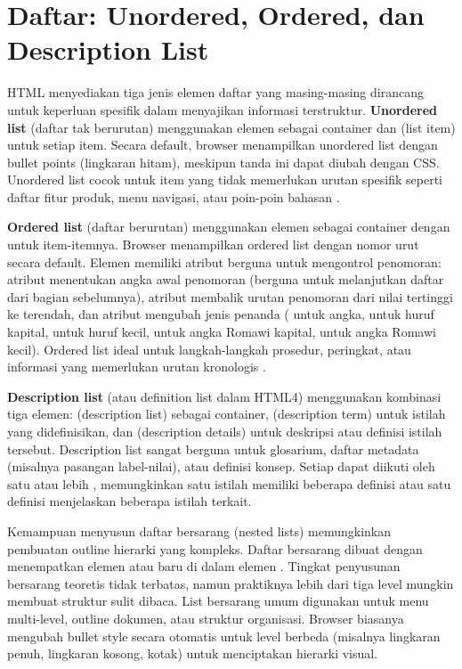 ﻿\section{Daftar: Unordered, Ordered, dan Description List}

HTML menyediakan tiga jenis elemen daftar yang masing-masing dirancang untuk keperluan spesifik dalam menyajikan informasi terstruktur. \textbf{Unordered list} (daftar tak berurutan) menggunakan elemen  sebagai container dan  (list item) untuk setiap item. Secara default, browser menampilkan unordered list dengan bullet points (lingkaran hitam), meskipun tanda ini dapat diubah dengan CSS. Unordered list cocok untuk item yang tidak memerlukan urutan spesifik seperti daftar fitur produk, menu navigasi, atau poin-poin bahasan \cite{mdnHtmlIntro}.

\textbf{Ordered list} (daftar berurutan) menggunakan elemen  sebagai container dengan  untuk item-itemnya. Browser menampilkan ordered list dengan nomor urut secara default. Elemen  memiliki atribut berguna untuk mengontrol penomoran: atribut  menentukan angka awal penomoran (berguna untuk melanjutkan daftar dari bagian sebelumnya), atribut  membalik urutan penomoran dari nilai tertinggi ke terendah, dan atribut  mengubah jenis penanda ( untuk angka,  untuk huruf kapital,  untuk huruf kecil,  untuk angka Romawi kapital,  untuk angka Romawi kecil). Ordered list ideal untuk langkah-langkah prosedur, peringkat, atau informasi yang memerlukan urutan kronologis \cite{webdevHtml}.

\textbf{Description list} (atau definition list dalam HTML4) menggunakan kombinasi tiga elemen:  (description list) sebagai container,  (description term) untuk istilah yang didefinisikan, dan  (description details) untuk deskripsi atau definisi istilah tersebut. Description list sangat berguna untuk glosarium, daftar metadata (misalnya pasangan label-nilai), atau definisi konsep. Setiap  dapat diikuti oleh satu atau lebih , memungkinkan satu istilah memiliki beberapa definisi atau satu definisi menjelaskan beberapa istilah terkait.

Kemampuan menyusun daftar bersarang (nested lists) memungkinkan pembuatan outline hierarki yang kompleks. Daftar bersarang dibuat dengan menempatkan elemen  atau  baru di dalam elemen . Tingkat penyusunan bersarang teoretis tidak terbatas, namun praktiknya lebih dari tiga level mungkin membuat struktur sulit dibaca. List bersarang umum digunakan untuk menu multi-level, outline dokumen, atau struktur organisasi. Browser biasanya mengubah bullet style secara otomatis untuk level berbeda (misalnya lingkaran penuh, lingkaran kosong, kotak) untuk menciptakan hierarki visual.

